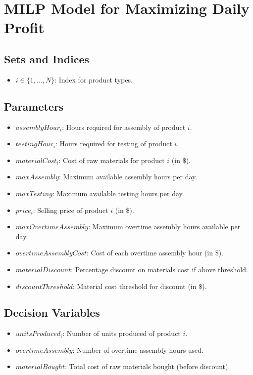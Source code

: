\documentclass{article}
\begin{document}
\section*{MILP Model for Maximizing Daily Profit}

\subsection*{Sets and Indices}
\begin{itemize}
    \item $i \in \{1, \ldots, N\}$: Index for product types.
\end{itemize}

\subsection*{Parameters}
\begin{itemize}
    \item $assemblyHour_i$: Hours required for assembly of product $i$.
    \item $testingHour_i$: Hours required for testing of product $i$.
    \item $materialCost_i$: Cost of raw materials for product $i$ (in \$).
    \item $maxAssembly$: Maximum available assembly hours per day.
    \item $maxTesting$: Maximum available testing hours per day.
    \item $price_i$: Selling price of product $i$ (in \$).
    \item $maxOvertimeAssembly$: Maximum overtime assembly hours available per day.
    \item $overtimeAssemblyCost$: Cost of each overtime assembly hour (in \$).
    \item $materialDiscount$: Percentage discount on materials cost if above threshold.
    \item $discountThreshold$: Material cost threshold for discount (in \$).
\end{itemize}

\subsection*{Decision Variables}
\begin{itemize}
    \item $unitsProduced_i$: Number of units produced of product $i$.
    \item $overtimeAssembly$: Number of overtime assembly hours used.
    \item $materialBought$: Total cost of raw materials bought (before discount).
\end{itemize}
\end{document}

